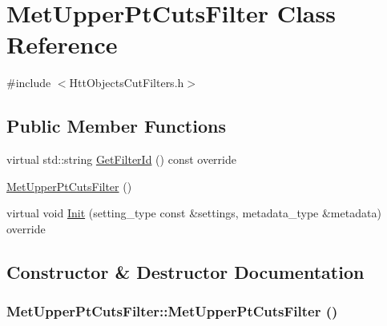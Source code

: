 \hypertarget{classMetUpperPtCutsFilter}{
\section{MetUpperPtCutsFilter Class Reference}
\label{classMetUpperPtCutsFilter}
}


{\ttfamily \#include $<$HttObjectsCutFilters.h$>$}\subsection*{Public Member Functions}
\begin{DoxyCompactItemize}
\item 
virtual std::string \hyperlink{classMetUpperPtCutsFilter_aab40830d4ab4c77cea3a90ac3d2fcf04}{GetFilterId} () const override
\item 
\hyperlink{classMetUpperPtCutsFilter_a37a6a32ca9e29bc5f7d4602c393ab2f9}{MetUpperPtCutsFilter} ()
\item 
virtual void \hyperlink{classMetUpperPtCutsFilter_a6199686004b45bee571b5f802993b9fe}{Init} (setting\_\-type const \&settings, metadata\_\-type \&metadata) override
\end{DoxyCompactItemize}


\subsection{Constructor \& Destructor Documentation}
\hypertarget{classMetUpperPtCutsFilter_a37a6a32ca9e29bc5f7d4602c393ab2f9}{
\subsubsection[{MetUpperPtCutsFilter}]{\setlength{\rightskip}{0pt plus 5cm}MetUpperPtCutsFilter::MetUpperPtCutsFilter ()}}
\label{classMetUpperPtCutsFilter_a37a6a32ca9e29bc5f7d4602c393ab2f9}


